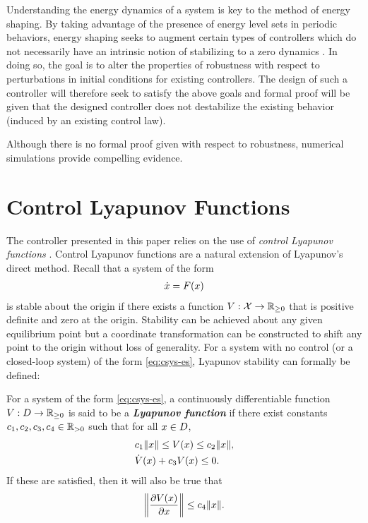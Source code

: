 Understanding the energy dynamics of a system is key to the method of energy
shaping.
%
By taking advantage of the presence of energy level sets in periodic behaviors,
energy shaping seeks to augment certain types of controllers which do not
necessarily have an intrinsic notion of stabilizing to a zero dynamics
\cite{Ames2014}.
%
In doing so, the goal is to alter the properties of robustness with respect to
perturbations in initial conditions for existing controllers.
%
The design of such a controller will therefore seek to satisfy the above goals
and formal proof will be given that the designed controller does not destabilize
the existing behavior (induced by an existing control law).

Although there is no formal proof given with respect to robustness, numerical
simulations provide compelling evidence.

\section{Control Lyapunov Functions}

The controller presented in this paper relies on the use of {\em control Lyapunov
  functions} \cite{Artstein1983,Freeman1996}.
%
Control Lyapunov functions are a natural extension of Lyapunov's direct method.
%
Recall that a system of the form
\begin{align}
  \label{eq:csys-es}
  {\dot {x}} = F(x)
\end{align}
is stable about the origin if there exists a function $V : \mathcal{X} \to \mathbb{R}_{\geq 0}$ that is
positive definite and zero at the origin.
%
Stability can be achieved about any given equilibrium point but a coordinate
transformation can be constructed to shift any point to the origin without loss
of generality.
%
For a system with no control (or a closed-loop system) of the form
\eqref{eq:csys-es}, Lyapunov stability can formally be defined:
%
\begin{definition}
  \label{def:lyap-func}
  For a system of the form \eqref{eq:csys-es}, a continuously differentiable
  function $V : D \to \mathbb{R}_{\geq 0}$ is said to be a {\bf \em Lyapunov function} if
  there exist constants $c_{1}, c_{2}, c_{3}, c_{4} \in \mathbb{R}_{> 0}$ such that for all
  $x \in D$,
  \begin{eqnarray}
    &c_{1} \|x\| \leq V(x) \leq c_{2} \|x\|,\\
    \nonumber
    &{\dot V}(x) + c_{3} V(x) \leq 0.
  \end{eqnarray}
  If these are satisfied, then it will also be true that
  \begin{align}
    \label{eq:dVedx-bounds}
    \left\| \frac{\partial{V(x)}}{\partial{x}} \right\| \leq c_{4} \|x\|.
  \end{align}
\end{definition}

